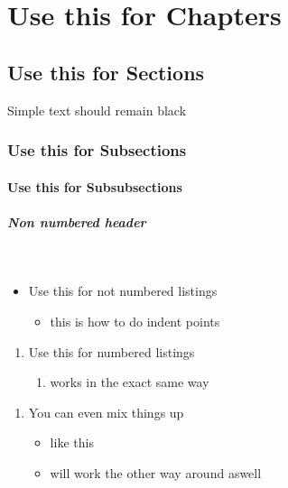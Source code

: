 \documentclass[openany]{scrreprt}
\begin{document}
\chapter{Use this for Chapters} %

\section{Use this for Sections} %

Simple text should remain black

\subsection{Use this for Subsections}

\subsubsection{Use this for Subsubsections}

\paragraph{Non numbered header}\ \\

\begin{itemize}
\item Use this for not numbered listings
	\begin{itemize}
	\item this is how to do indent points
	\end{itemize}
\end{itemize}

\begin{enumerate}
\item Use this for numbered listings
	\begin{enumerate}
	\item works in the exact same way
	\end{enumerate}
\end{enumerate}

\begin{enumerate}
\item You can even mix things up
	\begin{itemize}
	\item like this
	\item will work the other way around aswell
	\end{itemize}
\end{enumerate}
\end{document}
